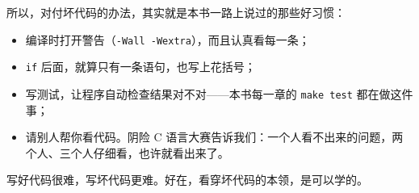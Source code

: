 所以，对付坏代码的办法，其实就是本书一路上说过的那些好习惯：
\begin{itemize}
  \item 编译时打开警告（\texttt{-Wall -Wextra}），而且认真看每一条；
  \item \texttt{if} 后面，就算只有一条语句，也写上花括号；
  \item 写测试，让程序自动检查结果对不对——本书每一章的 \texttt{make test} 都在做这件事；
  \item 请别人帮你看代码。阴险 C 语言大赛告诉我们：一个人看不出来的问题，两个人、三个人仔细看，也许就看出来了。
\end{itemize}

写好代码很难，写坏代码更难。好在，看穿坏代码的本领，是可以学的。
